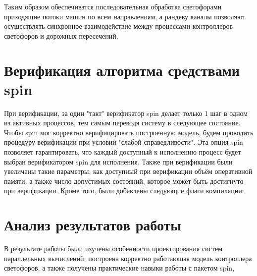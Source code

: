 \documentclass[12pt]{article}
\begin{document}


Таким образом обеспечиватся последовательная обработка светофорами приходящие потоки машин по 
всем направлениям, а рандеву каналы позволяют осуществлять синхронное взаимодействие между 
процессами контроллеров светофоров и дорожных пересечений.

\section{Верификация алгоритма средствами spin}

При верификации, за один "такт" верификатор spin делает только 1 шаг в одном из активных процессов, тем самым
переводя систему в следующее состояние. Чтобы spin мог корректно верифицировать построенную модель, будем
проводить процедуру верификации при условии "слабой справедливости". Эта опция spin позволяет гарантировать,
что каждый доступный к исполнению процесс будет выбран верификатором spin для исполнения. Также при верификации 
были увеличены такие параметры, как доступный при верификации объём оперативной памяти, а также число допустимых 
состояний, которое может быть достигнуто при верификации. Кроме того, были добавлены следующие флаги компиляции:


\section{Анализ результатов работы}

В результате работы были изучены особенности проектирования систем параллельных вычислений. построена корректно
работающая модель контроллера светофоров, а также получены практические навыки работы с пакетом spin,
\end{document}
